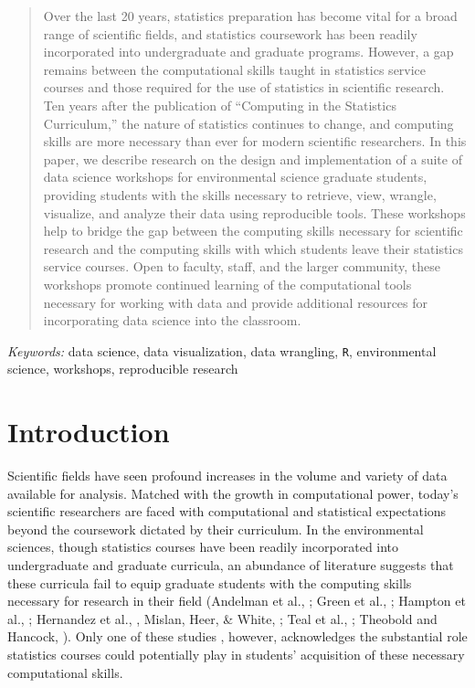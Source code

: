 \documentclass[12pt]{article}
\begin{document}
\begin{abstract}

\noindent Over the last 20 years, statistics preparation has become vital for a
broad range of scientific fields, and statistics coursework has been readily 
incorporated into undergraduate and graduate programs. However, a gap remains 
between the computational skills taught in statistics service courses and those
required for the use of statistics in scientific research. Ten years after the 
publication of ``Computing in the Statistics Curriculum,'' the nature of 
statistics continues to change, and computing skills are more necessary than 
ever for modern scientific researchers. In this paper, we describe research on 
the design and implementation of a suite of data science workshops for 
environmental science graduate students, providing students with the skills 
necessary to retrieve, view, wrangle, visualize, and analyze their data using 
reproducible tools. These workshops help to bridge the gap between the computing
skills necessary for scientific research and the computing skills with which
students leave their statistics service courses. Open to faculty, staff, and the 
larger community, these workshops promote continued learning of the
computational tools necessary for working with data and provide additional
resources for incorporating data science into the classroom.

\end{abstract}

\noindent %
{\it Keywords:} data science, data visualization, data wrangling, \texttt{R}, 
environmental science, workshops, reproducible research 

\vfill

\newpage
{}

\section{Introduction}
\label{sec:intro}

\noindent Scientific fields have seen profound increases in the volume and variety 
of data available for analysis. Matched with the growth in computational power, 
today's scientific researchers are faced with computational and statistical 
expectations beyond the coursework dictated by their curriculum. In the
environmental sciences, though statistics courses have been readily incorporated
into undergraduate and graduate curricula, an abundance of literature suggests 
that these curricula fail to equip graduate students with the computing skills 
necessary for research in their field (Andelman et al., \citeyear{andelman}; 
Green et al., \citeyear{green}; Hampton et al., \citeyear{hampton}; Hernandez et
al., \citeyear{hernandez}, Mislan, Heer, \& White, \citeyear{mislan}; Teal et 
al., \citeyear{carpentry}; Theobold and Hancock, \citeyear{theobold}). Only 
one of these studies \citep{theobold}, however, acknowledges the substantial 
role statistics courses could potentially play in students' acquisition of 
these necessary computational skills. 
\end{document}
